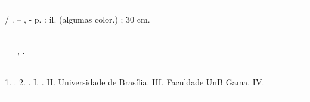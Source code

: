 \begin{fichacatalografica}
\vspace*{\fill} %
\hrule	%
\begin{center} %
\begin{minipage}[c]{12.5cm} %
\imprimirautor
\hspace{0.5cm} \imprimirtitulo / \imprimirautor. --
\imprimirlocal, \imprimirdata-
\hspace{0.5cm} \pageref{LastPage} p. : il. (algumas color.) ; 30 cm.\\
\hspace{0.5cm} \imprimirorientadorRotulo~\imprimirorientador\\
\hspace{0.5cm}
\parbox[t]{\textwidth}{\imprimirtipotrabalho~--~\imprimirinstituicao,
\imprimirdata.}\\
\hspace{0.5cm}
1. \imprimirpalavrachaveum.
2. \imprimirpalavrachavedois.
I. \imprimirorientador.
II. Universidade de Brasília.
III. Faculdade UnB Gama.
IV. \imprimirtitulo\\
\end{minipage}
\end{center}
\hrule
\end{fichacatalografica}
